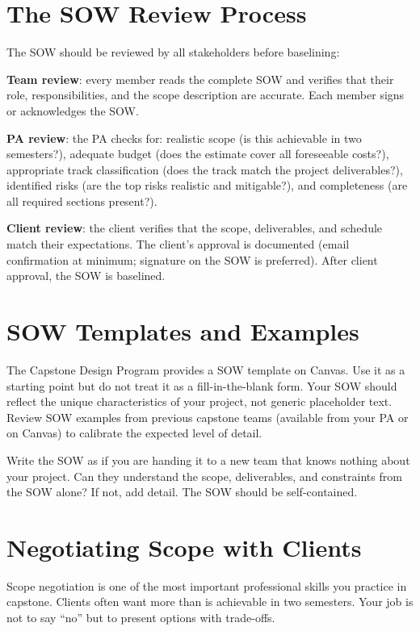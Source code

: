 \section{The SOW Review Process}
The SOW should be reviewed by all stakeholders before baselining:

\textbf{Team review}: every member reads the complete SOW and verifies that their role, responsibilities, and the scope description are accurate. Each member signs or acknowledges the SOW.

\textbf{PA review}: the PA checks for: realistic scope (is this achievable in two semesters?), adequate budget (does the estimate cover all foreseeable costs?), appropriate track classification (does the track match the project deliverables?), identified risks (are the top risks realistic and mitigable?), and completeness (are all required sections present?).

\textbf{Client review}: the client verifies that the scope, deliverables, and schedule match their expectations. The client's approval is documented (email confirmation at minimum; signature on the SOW is preferred). After client approval, the SOW is baselined.

\section{SOW Templates and Examples}
The Capstone Design Program provides a SOW template on Canvas. Use it as a starting point but do not treat it as a fill-in-the-blank form. Your SOW should reflect the unique characteristics of your project, not generic placeholder text. Review SOW examples from previous capstone teams (available from your PA or on Canvas) to calibrate the expected level of detail.

\begin{tipbox}
Write the SOW as if you are handing it to a new team that knows nothing about your project. Can they understand the scope, deliverables, and constraints from the SOW alone? If not, add detail. The SOW should be self-contained.
\end{tipbox}



\section{Negotiating Scope with Clients}
Scope negotiation is one of the most important professional skills you practice in capstone. Clients often want more than is achievable in two semesters. Your job is not to say ``no'' but to present options with trade-offs.

